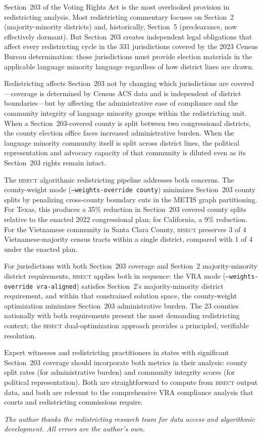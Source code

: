 \label{sec:conclusion}

Section~203 of the Voting Rights Act is the most overlooked provision
in redistricting analysis. Most redistricting commentary focuses on
Section~2 (majority-minority districts) and, historically, Section~5
(preclearance, now effectively dormant). But Section~203 creates
independent legal obligations that affect every redistricting cycle in
the 331 jurisdictions covered by the 2023 Census Bureau determination:
those jurisdictions must provide election materials in the applicable
language minority language regardless of how district lines are drawn.

Redistricting affects Section~203 not by changing which jurisdictions are
covered---coverage is determined by Census ACS data and is independent of
district boundaries---but by affecting the administrative ease of compliance
and the community integrity of language minority groups within the
redistricting unit. When a Section~203-covered county is split between
two congressional districts, the county election office faces increased
administrative burden. When the language minority community itself is split
across district lines, the political representation and advocacy capacity
of that community is diluted even as its Section~203 rights remain intact.

The \textsc{bisect} algorithmic redistricting pipeline addresses both
concerns. The county-weight mode (\texttt{--weights-override county})
minimizes Section~203 county splits by penalizing cross-county boundary
cuts in the METIS graph partitioning. For Texas, this produces a 35\%
reduction in Section~203 covered county splits relative to the enacted
2022 congressional plan; for California, a 9\% reduction. For the
Vietnamese community in Santa Clara County, \textsc{bisect} preserves
3 of 4 Vietnamese-majority census tracts within a single district,
compared with 1 of 4 under the enacted plan.

For jurisdictions with both Section~203 coverage and Section~2
majority-minority district requirements, \textsc{bisect} applies both
in sequence: the VRA mode (\texttt{--weights-override vra-aligned})
satisfies Section~2's majority-minority district requirement, and within
that constrained solution space, the county-weight optimization minimizes
Section~203 administrative burden. The 23 counties nationally with both
requirements present the most demanding redistricting context; the
\textsc{bisect} dual-optimization approach provides a principled,
verifiable resolution.

Expert witnesses and redistricting practitioners in states with significant
Section~203 coverage should incorporate both metrics in their analysis:
county split rates (for administrative burden) and community integrity
scores (for political representation). Both are straightforward to compute
from \textsc{bisect} output data, and both are relevant to the comprehensive
VRA compliance analysis that courts and redistricting commissions require.

\bigskip
\noindent\textit{The author thanks the redistricting research team for
data access and algorithmic development. All errors are the author's own.}
